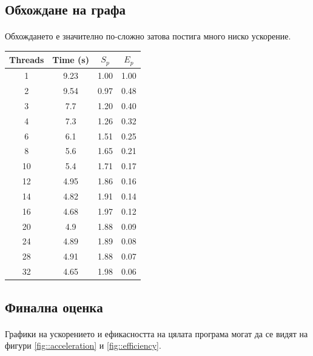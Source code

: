 \subsection*{Обхождане на графа}

\paragraph*{} Обхождането е значително по-сложно затова постига много ниско ускорение. \\

\begin{tabular}{|c|c|c|c|}
\hline
Threads & Time (s) & $S_p$ & $E_p$\\
\hline \hline
1 & 9.23 & 1.00 & 1.00 \\
\hline
2 & 9.54 & 0.97 & 0.48 \\
\hline
3 & 7.7 & 1.20 & 0.40 \\
\hline
4 & 7.3 & 1.26 & 0.32 \\
\hline
6 & 6.1 & 1.51 & 0.25 \\
\hline
8 & 5.6 & 1.65 & 0.21 \\
\hline
10 & 5.4 & 1.71 & 0.17 \\
\hline
12 & 4.95 & 1.86 & 0.16 \\
\hline
14 & 4.82 & 1.91 & 0.14 \\
\hline
16 & 4.68 & 1.97 & 0.12 \\
\hline
20 & 4.9 & 1.88 & 0.09 \\
\hline
24 & 4.89 & 1.89 & 0.08 \\
\hline
28 & 4.91 & 1.88 & 0.07 \\
\hline
32 & 4.65 & 1.98 & 0.06 \\
\hline
\end{tabular}

\subsection*{Финална оценка}

\paragraph*{} Графики на ускорението и ефикасността на цялата програма могат да се видят на фигури \ref{fig::acceleration} и \ref{fig::efficiency}. \\

